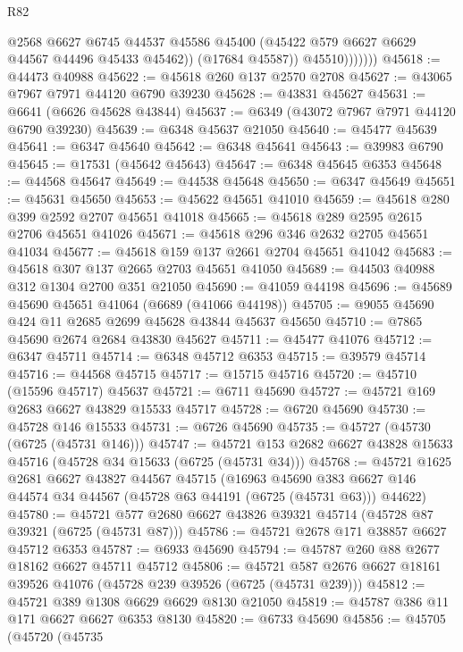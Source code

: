 \begin{lexlean}{R82}
\begin{coremodule}
                      @2568
                      @6627
                      @6745
                      @44537
                      @45586
                      @45400
                      (@45422 @579 @6627 @6629 @44567 @44496 @45433 @45462))
                    (@17684 @45587))
                  @45510)))))))
@45618 := @44473 @40988
@45622 := @45618 @260 @137 @2570 @2708
@45627 := @43065 @7967 @7971 @44120 @6790 @39230
@45628 := @43831 @45627
@45631 := @6641 (@6626 @45628 @43844)
@45637 := @6349 (@43072 @7967 @7971 @44120 @6790 @39230)
@45639 := @6348 @45637 @21050
@45640 := @45477 @45639
@45641 := @6347 @45640
@45642 := @6348 @45641
@45643 := @39983 @6790
@45645 := @17531 (@45642 @45643)
@45647 := @6348 @45645 @6353
@45648 := @44568 @45647
@45649 := @44538 @45648
@45650 := @6347 @45649
@45651 := @45631 @45650
@45653 := @45622 @45651 @41010
@45659 := @45618 @280 @399 @2592 @2707 @45651 @41018
@45665 := @45618 @289 @2595 @2615 @2706 @45651 @41026
@45671 := @45618 @296 @346 @2632 @2705 @45651 @41034
@45677 := @45618 @159 @137 @2661 @2704 @45651 @41042
@45683 := @45618 @307 @137 @2665 @2703 @45651 @41050
@45689 := @44503 @40988 @312 @1304 @2700 @351 @21050
@45690 := @41059 @44198
@45696 := @45689 @45690 @45651 @41064 (@6689 (@41066 @44198))
@45705 := @9055 @45690 @424 @11 @2685 @2699 @45628 @43844 @45637 @45650
@45710 := @7865 @45690 @2674 @2684 @43830 @45627
@45711 := @45477 @41076
@45712 := @6347 @45711
@45714 := @6348 @45712 @6353
@45715 := @39579 @45714
@45716 := @44568 @45715
@45717 := @15715 @45716
@45720 := @45710 (@15596 @45717) @45637
@45721 := @6711 @45690
@45727 := @45721 @169 @2683 @6627 @43829 @15533 @45717
@45728 := @6720 @45690
@45730 := @45728 @146 @15533
@45731 := @6726 @45690
@45735 := @45727 (@45730 (@6725 (@45731 @146)))
@45747 := @45721 @153 @2682 @6627 @43828 @15633 @45716 (@45728 @34 @15633 (@6725 (@45731 @34)))
@45768 := @45721
    @1625
    @2681
    @6627
    @43827
    @44567
    @45715
    (@16963
      @45690
      @383
      @6627
      @146
      @44574
      @34
      @44567
      (@45728 @63 @44191 (@6725 (@45731 @63)))
      @44622)
@45780 := @45721 @577 @2680 @6627 @43826 @39321 @45714 (@45728 @87 @39321 (@6725 (@45731 @87)))
@45786 := @45721 @2678 @171 @38857 @6627 @45712 @6353
@45787 := @6933 @45690
@45794 := @45787 @260 @88 @2677 @18162 @6627 @45711 @45712
@45806 := @45721 @587 @2676 @6627 @18161 @39526 @41076 (@45728 @239 @39526 (@6725 (@45731 @239)))
@45812 := @45721 @389 @1308 @6629 @6629 @8130 @21050
@45819 := @45787 @386 @11 @171 @6627 @6627 @6353 @8130
@45820 := @6733 @45690
@45856 := @45705
    (@45720
      (@45735

\end{coremodule}
\end{lexlean}
